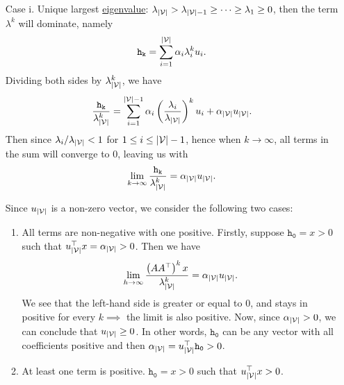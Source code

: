 \begin{enumerate}
	\item[Case i.] Unique largest \hyperref[def:eigenvalue]{eigenvalue}:
		\(\lambda_{\left\vert \mathcal{\MakeUppercase{v}} \right\vert } > \lambda_{\left\vert \mathcal{\MakeUppercase{v}} \right\vert -1} \geq \cdots \geq \lambda_{1}\geq 0\),
		then the term \(\lambda^k\)	will dominate, namely
		\[
			\mathtt{h_k} = \sum\limits_{i=1}^{\left\vert \mathcal{\MakeUppercase{v}} \right\vert } \alpha_{i}\lambda_{i}^k u_{i}.
		\]
		Dividing both sides by \(\lambda_{\left\vert \mathcal{\MakeUppercase{v}} \right\vert }^k\), we have
		\[
			\frac{\mathtt{h_{k}}}{\lambda_{\left\vert \mathcal{\MakeUppercase{v}} \right\vert }^k}
			= \sum\limits_{i=1}^{\left\vert \mathcal{\MakeUppercase{v}} \right\vert  - 1}\alpha_{i}
			\left(\frac{\lambda_{i}}{\lambda_{\left\vert \mathcal{\MakeUppercase{v}} \right\vert }}\right)^k u_{i}
			+ \alpha_{\left\vert \mathcal{\MakeUppercase{v}} \right\vert }u_{\left\vert \mathcal{\MakeUppercase{v}} \right\vert }.
		\]
		Then since \(\lambda_{i}/\lambda_{\left\vert \mathcal{\MakeUppercase{v}} \right\vert }< 1\) for \(1\leq i\leq \left\vert \mathcal{\MakeUppercase{v}} \right\vert -1\), hence when \(k\to \infty\), all terms in the sum will converge to \(0\), leaving us with
		\[
			\lim_{k \to \infty} \frac{\mathtt{h_k}}{\lambda_{\left\vert \mathcal{\MakeUppercase{v}} \right\vert }^k}= \alpha_{\left\vert \mathcal{\MakeUppercase{v}} \right\vert } u_{\left\vert \mathcal{\MakeUppercase{v}} \right\vert }.
		\]

		Since \(u_{\left\vert \mathcal{\MakeUppercase{v}} \right\vert }\) is a non-zero vector, we consider the following two cases:
		\begin{enumerate}
			\item All terms are non-negative with one positive. Firstly, suppose \(\mathtt{h_0}= x>0\) such that \(u_{\left\vert \mathcal{\MakeUppercase{v}} \right\vert }^{\top}x = \alpha_{\left\vert \mathcal{\MakeUppercase{v}} \right\vert } >0\).
			      Then we have
			      \[
				      \lim\limits_{h \to \infty} \frac{\left(A A^{\top}\right)^k x}{\lambda_{\left\vert \mathcal{\MakeUppercase{v}} \right\vert }^k} = \alpha_{\left\vert \mathcal{\MakeUppercase{v}} \right\vert }u_{\left\vert \mathcal{\MakeUppercase{v}} \right\vert }.
			      \]
			      We see that the left-hand side is greater or equal to \(0\), and stays in positive for every \(k\implies \) the limit is also positive. Now, since \(\alpha_{\left\vert \mathcal{\MakeUppercase{v}} \right\vert }>0\), we can conclude that \(u_{\left\vert \mathcal{\MakeUppercase{v}} \right\vert }\geq 0\). In other words, \(\mathtt{h_0}\) can be any vector with all coefficients positive and then \(\alpha_{\left\vert \mathcal{\MakeUppercase{v}} \right\vert } = u^{\top}_{\left\vert \mathcal{\MakeUppercase{v}} \right\vert }\mathtt{h_0}>0\).
			\item At least one term is positive. \(\mathtt{h_0} = x > 0\) such that \(u_{\left\vert \mathcal{\MakeUppercase{v}} \right\vert }^{\top}x>0\).
		\end{enumerate}


\end{enumerate}
